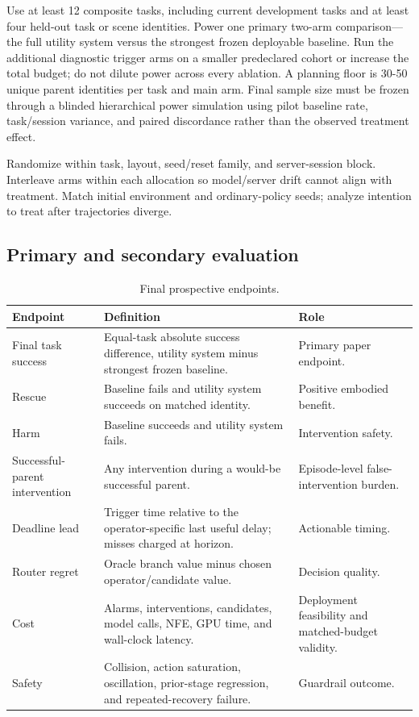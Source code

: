 Use at least 12 composite tasks, including current development tasks and at least four held-out task or scene identities. Power one primary two-arm comparison---the full utility system versus the strongest frozen deployable baseline. Run the additional diagnostic trigger arms on a smaller predeclared cohort or increase the total budget; do not dilute power across every ablation. A planning floor is 30-50 unique parent identities per task and main arm. Final sample size must be frozen through a blinded hierarchical power simulation using pilot baseline rate, task/session variance, and paired discordance rather than the observed treatment effect.

Randomize within task, layout, seed/reset family, and server-session block. Interleave arms within each allocation so model/server drift cannot align with treatment. Match initial environment and ordinary-policy seeds; analyze intention to treat after trajectories diverge.

\subsection{Primary and secondary evaluation}

\begin{table}[H]
\centering
\caption{Final prospective endpoints.}
\label{tab:phase7-endpoints}
\small
\begin{tabularx}{\textwidth}{P{0.25\textwidth}P{0.32\textwidth}Y}
\toprule
Endpoint & Definition & Role \\
\midrule
Final task success & Equal-task absolute success difference, utility system minus strongest frozen baseline. & Primary paper endpoint. \\
Rescue & Baseline fails and utility system succeeds on matched identity. & Positive embodied benefit. \\
Harm & Baseline succeeds and utility system fails. & Intervention safety. \\
Successful-parent intervention & Any intervention during a would-be successful parent. & Episode-level false-intervention burden. \\
Deadline lead & Trigger time relative to the operator-specific last useful delay; misses charged at horizon. & Actionable timing. \\
Router regret & Oracle branch value minus chosen operator/candidate value. & Decision quality. \\
Cost & Alarms, interventions, candidates, model calls, NFE, GPU time, and wall-clock latency. & Deployment feasibility and matched-budget validity. \\
Safety & Collision, action saturation, oscillation, prior-stage regression, and repeated-recovery failure. & Guardrail outcome. \\
\bottomrule
\end{tabularx}
\end{table}

